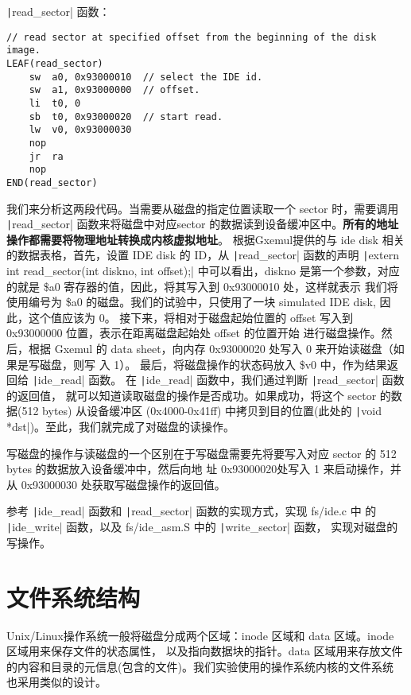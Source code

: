 \texttt|read_sector| 函数：

\begin{verbatim}
// read sector at specified offset from the beginning of the disk image.
LEAF(read_sector)
    sw  a0, 0x93000010  // select the IDE id.
    sw  a1, 0x93000000  // offset.
    li  t0, 0
    sb  t0, 0x93000020  // start read.
    lw  v0, 0x93000030
    nop
    jr  ra
    nop
END(read_sector)
\end{verbatim}

我们来分析这两段代码。当需要从磁盘的指定位置读取一个 sector 时，需要调用 \texttt|read_sector|
函数来将磁盘中对应sector 的数据读到设备缓冲区中。\textbf{所有的地址操作都需要将物理地址转换成内核虚拟地址}。
根据Gxemul提供的与 ide disk 相关的数据表格，首先，设置 IDE disk 的 ID，从
\texttt|read_sector| 函数的声明 \texttt|extern int read_sector(int diskno, int offset);|
中可以看出，diskno 是第一个参数，对应的就是 \$a0 寄存器的值，因此，将其写入到 0x93000010 处，这样就表示
我们将使用编号为 \$a0 的磁盘。我们的试验中，只使用了一块 simulated IDE disk, 因此，这个值应该为 0。
接下来，将相对于磁盘起始位置的 offset 写入到 0x93000000 位置，表示在距离磁盘起始处 offset 的位置开始
进行磁盘操作。然后，根据 Gxemul 的 data sheet，向内存 0x93000020 处写入 0 来开始读磁盘（如果是写磁盘，则写
入 1）。
最后，将磁盘操作的状态码放入 \$v0 中，作为结果返回给 \texttt|ide_read| 函数。
在 \texttt|ide_read| 函数中，我们通过判断 \texttt|read_sector| 函数的返回值，
就可以知道读取磁盘的操作是否成功。如果成功，将这个 sector 的数据(512 bytes) 从设备缓冲区 (0x4000-0x41ff) 
中拷贝到目的位置(此处的 \texttt|void *dst|)。至此，我们就完成了对磁盘的读操作。

写磁盘的操作与读磁盘的一个区别在于写磁盘需要先将要写入对应 sector 的 512 bytes 的数据放入设备缓冲中，然后向地
址 0x93000020处写入 1 来启动操作，并从 0x93000030 处获取写磁盘操作的返回值。

\begin{exercise}
参考 \texttt|ide_read| 函数和 \texttt|read_sector| 函数的实现方式，实现 fs/ide.c 中
的 \texttt|ide_write| 函数，以及 fs/ide\_asm.S 中的 \texttt|write_sector| 函数，
实现对磁盘的写操作。
\end{exercise}

\section{文件系统结构}

\begin{note}
Unix/Linux操作系统一般将磁盘分成两个区域：inode 区域和 data 区域。inode 区域用来保存文件的状态属性，
以及指向数据块的指针。data 区域用来存放文件的内容和目录的元信息(包含的文件)。我们实验使用的操作系统内核的文件系统
也采用类似的设计。
\end{note}

